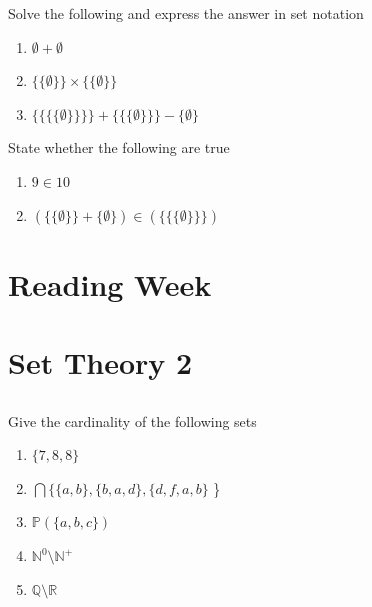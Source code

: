 \documentclass[twocolumn]{article}
\begin{document}
     Solve the following and express the answer in set notation
    
    \begin{enumerate}
        \item $ \emptyset + \emptyset $
        \item $ \{ \{ \emptyset \} \} \times \{ \{ \emptyset \} \} $
        \item $\{ \{ \{ \{ \emptyset \} \} \} \} + \{ \{ \{ \emptyset \} \} \} - \{ \emptyset \} $
    \end{enumerate}
    
    State whether the following are true

    \begin{enumerate}
        \item $ 9 \in 10 $
        \item $ (\{ \{ \emptyset \} \} + \{ \emptyset \} ) \in ( \{ \{ \{ \emptyset \} \} \} )$
    \end{enumerate}

\clearpage
\section{Reading Week}
    

\clearpage
\section{Set Theory 2}

\subsection{}

    Give the cardinality of the following sets

    \begin{enumerate}
        \item $\{ 7, 8, 8\}$
        \item $\bigcap \{ \{ a, b \}, \{ b, a, d\}, \{d, f, a, b \}$ \}
        \item $\mathbb{P}(\{ a, b, c\})$
        \item $\mathbb{N}^0 \setminus \mathbb{N}^+$
        \item $\mathbb{Q} \setminus \mathbb{R}$
    \end{enumerate}

\subsection{}
\end{document}
